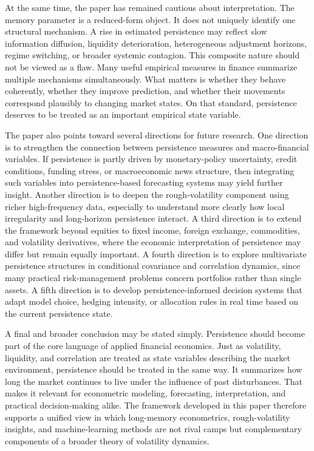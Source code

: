 \documentclass[12pt]{article}
\begin{document}
At the same time, the paper has remained cautious about interpretation. The memory parameter is a reduced-form object. It does not uniquely identify one structural mechanism. A rise in estimated persistence may reflect slow information diffusion, liquidity deterioration, heterogeneous adjustment horizons, regime switching, or broader systemic contagion. This composite nature should not be viewed as a flaw. Many useful empirical measures in finance summarize multiple mechanisms simultaneously. What matters is whether they behave coherently, whether they improve prediction, and whether their movements correspond plausibly to changing market states. On that standard, persistence deserves to be treated as an important empirical state variable.

The paper also points toward several directions for future research. One direction is to strengthen the connection between persistence measures and macro-financial variables. If persistence is partly driven by monetary-policy uncertainty, credit conditions, funding stress, or macroeconomic news structure, then integrating such variables into persistence-based forecasting systems may yield further insight. Another direction is to deepen the rough-volatility component using richer high-frequency data, especially to understand more clearly how local irregularity and long-horizon persistence interact. A third direction is to extend the framework beyond equities to fixed income, foreign exchange, commodities, and volatility derivatives, where the economic interpretation of persistence may differ but remain equally important. A fourth direction is to explore multivariate persistence structures in conditional covariance and correlation dynamics, since many practical risk-management problems concern portfolios rather than single assets. A fifth direction is to develop persistence-informed decision systems that adapt model choice, hedging intensity, or allocation rules in real time based on the current persistence state.

A final and broader conclusion may be stated simply. Persistence should become part of the core language of applied financial economics. Just as volatility, liquidity, and correlation are treated as state variables describing the market environment, persistence should be treated in the same way. It summarizes how long the market continues to live under the influence of past disturbances. That makes it relevant for econometric modeling, forecasting, interpretation, and practical decision-making alike. The framework developed in this paper therefore supports a unified view in which long-memory econometrics, rough-volatility insights, and machine-learning methods are not rival camps but complementary components of a broader theory of volatility dynamics.
\end{document}
